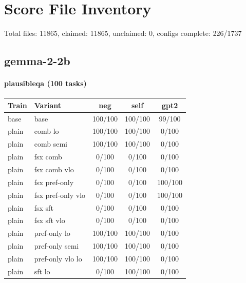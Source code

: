 \documentclass[10pt,landscape]{article}
\begin{document}
\section*{Score File Inventory}
Total files: 11865, claimed: 11865, unclaimed: 0, configs complete: 226/1737

\subsection*{gemma-2-2b}
\paragraph{plausibleqa (100 tasks)}
\begin{tabular}{llccc}
\toprule
Train & Variant & neg & self & gpt2 \\
\midrule
base & base & \cellcolor{done}100/100 & \cellcolor{done}100/100 & \cellcolor{partial}99/100 \\
plain & comb lo & \cellcolor{done}100/100 & \cellcolor{done}100/100 & \cellcolor{missing}0/100 \\
plain & comb semi & \cellcolor{done}100/100 & \cellcolor{done}100/100 & \cellcolor{missing}0/100 \\
plain & fsx comb & \cellcolor{missing}0/100 & \cellcolor{missing}0/100 & \cellcolor{missing}0/100 \\
plain & fsx comb vlo & \cellcolor{missing}0/100 & \cellcolor{missing}0/100 & \cellcolor{missing}0/100 \\
plain & fsx pref-only & \cellcolor{missing}0/100 & \cellcolor{missing}0/100 & \cellcolor{done}100/100 \\
plain & fsx pref-only vlo & \cellcolor{missing}0/100 & \cellcolor{missing}0/100 & \cellcolor{done}100/100 \\
plain & fsx sft & \cellcolor{missing}0/100 & \cellcolor{missing}0/100 & \cellcolor{missing}0/100 \\
plain & fsx sft vlo & \cellcolor{missing}0/100 & \cellcolor{missing}0/100 & \cellcolor{missing}0/100 \\
plain & pref-only lo & \cellcolor{done}100/100 & \cellcolor{done}100/100 & \cellcolor{missing}0/100 \\
plain & pref-only semi & \cellcolor{done}100/100 & \cellcolor{done}100/100 & \cellcolor{missing}0/100 \\
plain & pref-only vlo lo & \cellcolor{done}100/100 & \cellcolor{done}100/100 & \cellcolor{missing}0/100 \\
plain & sft lo & \cellcolor{missing}0/100 & \cellcolor{done}100/100 & \cellcolor{missing}0/100 \\

\end{tabular}
\end{document}
